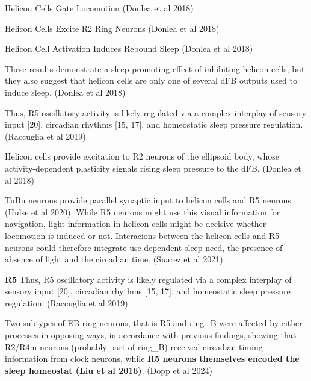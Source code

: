 Helicon Cells Gate Locomotion
\parencite{donleaRecurrentCircuitryBalancing2018} (Donlea et al 2018)

Helicon Cells Excite R2 Ring Neurons
\parencite{donleaRecurrentCircuitryBalancing2018} (Donlea et al 2018)

Helicon Cell Activation Induces Rebound Sleep
\parencite{donleaRecurrentCircuitryBalancing2018} (Donlea et al 2018)

These results demonstrate a sleep-promoting effect of inhibiting helicon cells,
but they also suggest that helicon cells are only one of several dFB outputs
used to induce sleep.
\parencite{donleaRecurrentCircuitryBalancing2018} (Donlea et al 2018)

Thus, R5 oscillatory activity is likely regulated via a complex interplay of
sensory input [20], circadian rhythms [15, 17], and homeostatic sleep pressure regulation.
\parencite{raccugliaNetworkSpecificSynchronizationElectrical2019} (Raccuglia et al 2019)

Helicon cells provide excitation to R2 neurons of the ellipsoid body, whose
activity-dependent plasticity signals rising sleep pressure to the dFB.
\parencite{donleaRecurrentCircuitryBalancing2018} (Donlea et al 2018)

TuBu neurons provide parallel synaptic input to helicon cells and R5 neurons (Hulse et al 2020).
While R5 neurons might use this visual information for navigation, light information in helicon cells might be
decisive whether locomotion is induced or not. Interacions between the helicon cells and R5
neurons could therefore integrate use-dependent sleep need, the presence of absence of light and the circadian time.
\parencite{suarez-grimaltNeuralArchitectureSleep2021}
(Suarez et al 2021)

\noindent\hrulefill


\textbf{R5}
Thus, R5 oscillatory activity is likely regulated via a complex interplay of
sensory input [20], circadian rhythms [15, 17], and homeostatic sleep pressure regulation.
\parencite{raccugliaNetworkSpecificSynchronizationElectrical2019} (Raccuglia et al 2019)

Two subtypes of EB ring neurons, that is R5 and ring\_B were affected by either
processes in opposing ways, in accordance with previous findings, showing that
R2/R4m neurons (probably part of ring\_B) received circadian timing
information from clock neurons, while
\textbf{R5 neurons themselves encoded the sleep homeostat (Liu et al 2016)}.
(Dopp et al 2024)


\noindent\hrulefill



